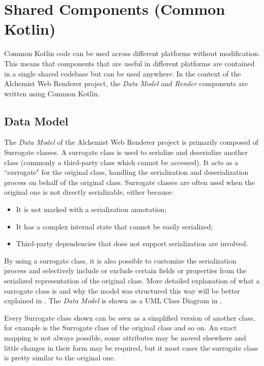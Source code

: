 \section{Shared Components (Common Kotlin)}
\label{sec:shared-components-common-kotlin}
Common Kotlin code can be used across different platforms without modification. This means that components that are useful in different platforms are contained in a single shared codebase but can be used anywhere. In the context of the Alchemist Web Renderer project, the \textit{Data Model} and \textit{Render} components are written using Common Kotlin.
\subsection{Data Model}
\label{ssec:data-model}
The \textit{Data Model} of the Alchemist Web Renderer project is primarily composed of Surrogate classes. A surrogate class is used to serialize and deserialize another class (commonly a third-party class which cannot be accessed). It acts as a ``surrogate" for the original class, handling the serialization and deserialization process on behalf of the original class. Surrogate classes are often used when the original one is not directly serializable, either because:
\begin{itemize}
	\item It is not marked with a serialization annotation;
	\item It has a complex internal state that cannot be easily serialized;
	\item Third-party dependencies that does not support serialization are involved.
\end{itemize}
By using a surrogate class, it is also possible to customize the serialization process and selectively include or exclude certain fields or properties from the serialized representation of the original class. More detailed explanation of what a surrogate class is and why the model was structured this way will be better explained in . The \textit{Data Model} is shown as a UML Class Diagram in .\newline


Every Surrogate class shown can be seen as a simplified version of another class, for example  is the Surrogate class of the original  class and so on. An exact mapping is not always possible, some attributes may be moved elsewhere and little changes in their form may be required, but it most cases the surrogate class is pretty similar to the original one.\newline

